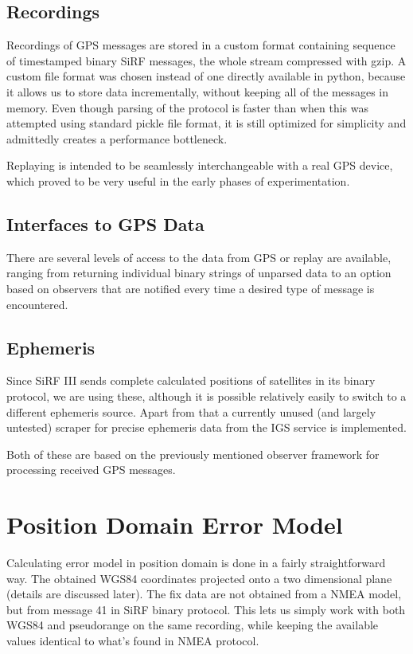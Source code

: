 \subsection{Recordings}
Recordings of GPS messages are stored in a custom format containing sequence
of timestamped binary SiRF messages, the whole stream compressed with gzip.
A custom file format was chosen instead of one directly available in python,
because it allows us to store data incrementally, without keeping all of the
messages in memory.
Even though parsing of the protocol is faster than when this was attempted
using standard pickle file format, it is still optimized for simplicity
and admittedly creates a performance bottleneck.

Replaying is intended to be seamlessly interchangeable with a real GPS device,
which proved to be very useful in the early phases of experimentation.

\subsection{Interfaces to GPS Data}
There are several levels of access to the data from GPS or replay are available,
ranging from returning individual binary strings of unparsed data to an option based
on observers that are notified every time a desired type of message is encountered.

\subsection{Ephemeris}
Since SiRF III sends complete calculated positions of satellites in its binary
protocol, we are using these, although it is possible relatively easily to switch
to a different ephemeris source.
Apart from that a currently unused (and largely untested) scraper for precise
ephemeris data from the IGS service \cite{orbit-data} is implemented.

Both of these are based on the previously mentioned observer framework for processing
received GPS messages.

\section{Position Domain Error Model}
Calculating error model in position domain is done in a fairly straightforward way.
The obtained WGS84 coordinates projected onto a two dimensional plane
(details are discussed later).
The fix data are not obtained from a NMEA model, but from message 41 in SiRF
binary protocol.
This lets us simply work with both WGS84 and pseudorange on the same recording,
while keeping the available values identical to what's found in NMEA protocol.

